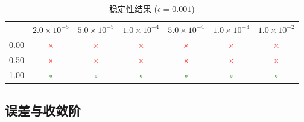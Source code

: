 \documentclass[12pt,a4paper]{article}
\begin{document}
\begin{table}[h]
	\centering
	\caption{稳定性结果 ($\epsilon = 0.001$)}
	\begin{tabular}{c|cccccc}
		\toprule
		\diagbox{K}{$\Delta t$} & $2.0 \times 10^{-5}$ & $5.0 \times 10^{-5}$ & $1.0 \times 10^{-4}$ & $5.0 \times 10^{-4}$ & $1.0 \times 10^{-3}$ & $1.0 \times 10^{-2}$ \\
		\midrule
		0.00 & \textcolor{red}{$\times$} & \textcolor{red}{$\times$} & \textcolor{red}{$\times$} & \textcolor{red}{$\times$} & \textcolor{red}{$\times$} & \textcolor{red}{$\times$} \\
		0.50 & \textcolor{red}{$\times$} & \textcolor{red}{$\times$} & \textcolor{red}{$\times$} & \textcolor{red}{$\times$} & \textcolor{red}{$\times$} & \textcolor{red}{$\times$} \\
		1.00 & \textcolor{green}{$\circ$} & \textcolor{green}{$\circ$} & \textcolor{green}{$\circ$} & \textcolor{green}{$\circ$} & \textcolor{green}{$\circ$} & \textcolor{green}{$\circ$} \\
		\bottomrule
	\end{tabular}
\end{table}

\subsection{误差与收敛阶}
\end{document}
